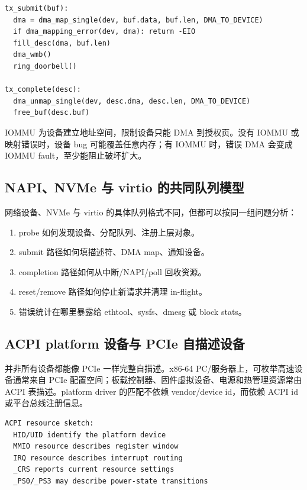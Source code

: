 \begin{lstlisting}
tx_submit(buf):
  dma = dma_map_single(dev, buf.data, buf.len, DMA_TO_DEVICE)
  if dma_mapping_error(dev, dma): return -EIO
  fill_desc(dma, buf.len)
  dma_wmb()
  ring_doorbell()

tx_complete(desc):
  dma_unmap_single(dev, desc.dma, desc.len, DMA_TO_DEVICE)
  free_buf(desc.buf)
\end{lstlisting}

IOMMU 为设备建立地址空间，限制设备只能 DMA 到授权页。没有 IOMMU 或映射错误时，设备 bug 可能覆盖任意内存；有 IOMMU 时，错误 DMA 会变成 IOMMU fault，至少能阻止破坏扩大。

\subsection{NAPI、NVMe 与 virtio 的共同队列模型}

网络设备、NVMe 与 virtio 的具体队列格式不同，但都可以按同一组问题分析：

\begin{enumerate}
\tightlist
\item probe 如何发现设备、分配队列、注册上层对象。
\item submit 路径如何填描述符、DMA map、通知设备。
\item completion 路径如何从中断/NAPI/poll 回收资源。
\item reset/remove 路径如何停止新请求并清理 in-flight。
\item 错误统计在哪里暴露给 ethtool、sysfs、dmesg 或 block stats。
\end{enumerate}

\subsection{ACPI platform 设备与 PCIe 自描述设备}

并非所有设备都能像 PCIe 一样完整自描述。x86-64 PC/服务器上，可枚举高速设备通常来自 PCIe 配置空间；板载控制器、固件虚拟设备、电源和热管理资源常由 ACPI 表描述。platform driver 的匹配不依赖 vendor/device id，而依赖 ACPI id 或平台总线注册信息。

\begin{lstlisting}
ACPI resource sketch:
  HID/UID identify the platform device
  MMIO resource describes register window
  IRQ resource describes interrupt routing
  _CRS reports current resource settings
  _PS0/_PS3 may describe power-state transitions
\end{lstlisting}

